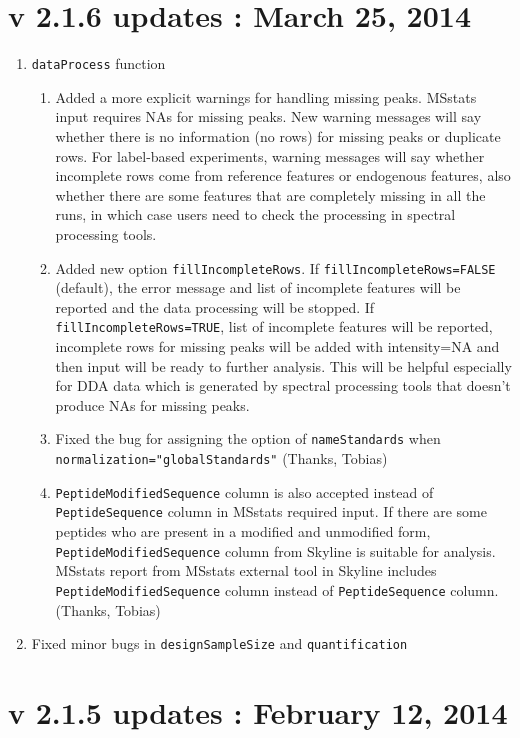 \documentclass[10pt]{article}
\begin{document}
\section*{v 2.1.6 updates : March 25, 2014}
\begin{enumerate}
\item {\tt dataProcess} function
	\begin{enumerate}
	\item Added a more explicit warnings for handling missing peaks. MSstats input requires NAs for missing peaks. New warning messages will say whether there is no information (no rows) for missing peaks or duplicate rows. For label-based experiments, warning messages will say whether incomplete rows come from reference features or endogenous features, also whether there are some features that are completely missing in all the runs, in which case users need to check the processing in spectral processing tools.
	\item Added new option {\tt fillIncompleteRows}.   If {\tt fillIncompleteRows=FALSE} (default), the error message and list of incomplete features will be reported and the data processing will be stopped. If {\tt fillIncompleteRows=TRUE}, list of incomplete features will be reported, incomplete rows for missing peaks will be added with intensity=NA and then input will be ready to further analysis. This will be helpful especially for DDA data which is generated by spectral processing tools that doesn't produce NAs for missing peaks.
	\item Fixed the bug for assigning the option of {\tt nameStandards} when {\tt normalization="globalStandards"} (Thanks, Tobias)
	\item {\tt PeptideModifiedSequence} column is also accepted instead of {\tt PeptideSequence} column in MSstats required input. If there are some peptides who are present in a modified and unmodified form, {\tt PeptideModifiedSequence} column from Skyline is suitable for analysis. MSstats report from MSstats external tool in Skyline includes {\tt PeptideModifiedSequence} column instead of {\tt PeptideSequence} column. (Thanks, Tobias)
	\end{enumerate}

\item Fixed minor bugs in {\tt designSampleSize} and {\tt quantification}
\end{enumerate}

\section*{v 2.1.5 updates : February 12, 2014}
\end{document}
